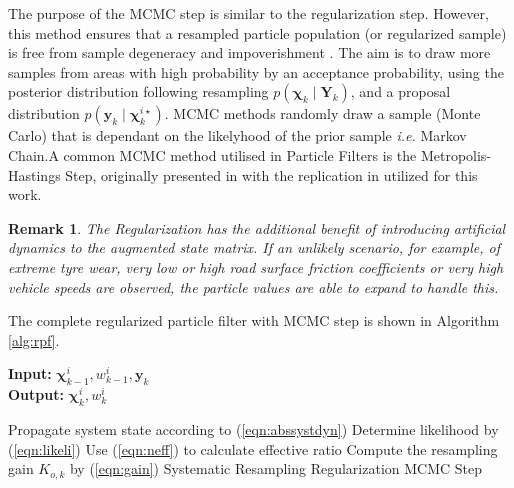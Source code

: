 \documentclass[onecolumn,journal,draftclsnofoot]{IEEEtran}
\newtheorem{remark}{Remark}
\begin{document}
The purpose of the MCMC step is similar to the regularization step. However, this method ensures that a resampled particle population (or regularized sample) is free from sample degeneracy and impoverishment \cite{Li2014}. 
The aim is to draw more samples from areas with high probability by an acceptance probability, using the posterior distribution following resampling \(p(\mathbf{\chi}_k \mid \mathbf{Y}_k)\), and a proposal distribution \(p(\mathbf{y}_k \mid \mathbf{\chi}_{k}^{i\star})\).  MCMC methods randomly draw a sample (Monte Carlo) that is dependant on the likelyhood of the prior sample \emph{i.e.} Markov Chain.A common MCMC method utilised in Particle Filters is the Metropolis-Hastings Step, originally presented in \cite{Andrieu2010} with the replication in \cite{Elfring2021} utilized for this work.
\begin{remark}
The Regularization has the additional benefit of introducing artificial dynamics to the augmented state matrix. If an unlikely scenario, for example, of extreme tyre wear, very low or high road surface friction coefficients or very high vehicle speeds are observed, the particle values are able to expand to handle this.
\end{remark}


The complete regularized particle filter with MCMC step is shown in Algorithm \ref{alg:rpf}.

\begin{algorithm} %
\caption{Regularized Particle Filter with MCMC Step}\label{alg:rpf}
 \hspace*{\algorithmicindent} \textbf{Input:}  \(\mathbf{\chi}_{k-1}^i,w_{k-1}^i,\mathbf{y}_k \)\\
 \hspace*{\algorithmicindent} \textbf{Output:} \(\mathbf{\chi}_{k}^i,w_{k}^i \)
\begin{algorithmic}[1]
    \STATE Propagate system state according to  (\ref{eqn:abssystdyn})
    \STATE Determine likelihood by (\ref{eqn:likeli})
    \STATE Use  (\ref{eqn:neff}) to calculate effective ratio
    \STATE Compute the resampling gain \(K_{o,k}\) by (\ref{eqn:gain})
        \STATE Systematic Resampling
        \STATE Regularization
        \STATE MCMC Step
    \ENDIF
\end{algorithmic}
\end{algorithm}
\end{document}
